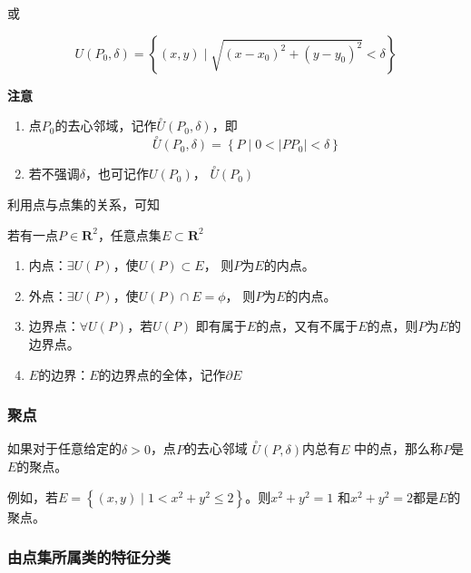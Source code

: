\documentclass[12pt, a4paper]{article}
\numberwithin{equation}{section}
\begin{document}
    或

    \[
        U\left(P_0,\delta\right) = \left\{\left(x,y\right)
        \mid \sqrt{\left(x-x_0\right)^2 + \left(y-y_0\right)^2} < \delta\right\}
    \]

    \textbf{注意}

    \begin{enumerate}
        \item 点\(P_0\)的去心邻域，记作$\stackrel{\circ}{U}\left(P_0, \delta\right)$，即
            $$
                \stackrel{\circ}{U}\left(P_0, \delta\right)=\left\{P\mid0<\left|P P_0\right|<\delta\right\}
            $$
        \item 若不强调\(\delta\)，也可记作\(U\left(P_0\right)\)，
            \(\stackrel{\circ}{U}\left(P_0\right)\)
    \end{enumerate}

    利用点与点集的关系，可知

    若有一点\(P \in \mathbf{R}^2\)，任意点集\(E \subset \mathbf{R}^2\)

    \begin{enumerate}
        \item 内点：\(\exists U\left(P\right)\)，使\(U\left(P\right) \subset E\)，
            则\(P\)为\(E\)的内点。
        \item 外点：\(\exists U\left(P\right)\)，使\(U\left(P\right) \cap E = \phi\)，
            则\(P\)为\(E\)的内点。
        \item 边界点：\(\forall U\left(P\right)\)，若\(U\left(P\right)\)
            即有属于\(E\)的点，又有不属于\(E\)的点，则\(P\)为\(E\)的边界点。
        \item \(E\)的边界：\(E\)的边界点的全体，记作\(\partial E\)
    \end{enumerate}

\subsubsection{聚点}

    如果对于任意给定的\(\delta>0\)，点\(P\)的去心邻域
    \(\stackrel{\circ}{U}\left(P,\delta\right)\)内总有\(E\)
    中的点，那么称\(P\)是\(E\)的聚点。

    例如，若\(E = \left\{\left(x,y\right) \mid
    1 < x^2+y^2 \leq 2\right\}\)。则\(x^2+y^2=1\)
    和\(x^2+y^2=2\)都是\(E\)的聚点。

\subsubsection{由点集所属类的特征分类}
\end{document}
